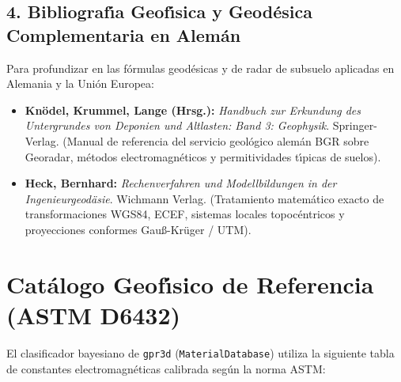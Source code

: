 \documentclass[11pt,a4paper]{article}
\begin{document}
\subsection{4. Bibliograf{\'\i}a Geof{\'\i}sica y Geod{\'e}sica Complementaria en Alem{\'a}n}
Para profundizar en las f{\'o}rmulas geod{\'e}sicas y de radar de subsuelo aplicadas en Alemania y la Uni{\'o}n Europea:
\begin{itemize}
    \item \textbf{Kn{\"o}del, Krummel, Lange (Hrsg.):} \textit{Handbuch zur Erkundung des Untergrundes von Deponien und Altlasten: Band 3: Geophysik}. Springer-Verlag. (Manual de referencia del servicio geol{\'o}gico alem{\'a}n BGR sobre Georadar, m{\'e}todos electromagn{\'e}ticos y permitividades t{\'\i}picas de suelos).
    \item \textbf{Heck, Bernhard:} \textit{Rechenverfahren und Modellbildungen in der Ingenieurgeod{\"a}sie}. Wichmann Verlag. (Tratamiento matem{\'a}tico exacto de transformaciones WGS84, ECEF, sistemas locales topoc{\'e}ntricos y proyecciones conformes Gau{\ss}-Kr{\"u}ger / UTM).
\end{itemize}

\section{Cat{\'a}logo Geof{\'\i}sico de Referencia (ASTM D6432)}

El clasificador bayesiano de \texttt{gpr3d} (\texttt{MaterialDatabase}) utiliza la siguiente tabla de constantes electromagn{\'e}ticas calibrada seg{\'u}n la norma ASTM:
\end{document}
